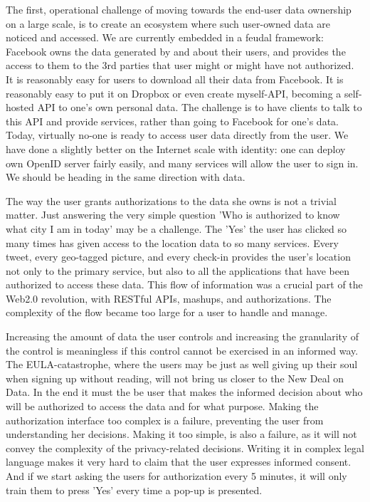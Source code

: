 The first, operational challenge of moving towards the end-user data ownership on a large scale, is to create an ecosystem where such user-owned data are noticed and accessed.
We are currently embedded in a feudal framework: Facebook owns the data generated by and about their users, and provides the access to them to the 3rd parties that user might or might have not authorized. 
It is reasonably easy for users to download all their data from Facebook. 
It is reasonably easy to put it on Dropbox or even create myself-API, becoming a self-hosted API to one's own personal data. 
The challenge is to have clients to talk to this API and provide services, rather than going to Facebook for one's data. 
Today, virtually no-one is ready to access user data directly from the user. 
We have done a slightly better on the Internet scale with identity: one can deploy own OpenID server fairly easily, and many services will allow the user to sign in. We should be heading in the same direction with data.

The way the user grants authorizations to the data she owns is not a trivial matter.
Just answering the very simple question 'Who is authorized to know what city I am in today' may be a challenge.
The 'Yes' the user has clicked so many times has given access to the location data to so many services.
Every tweet, every geo-tagged picture, and every check-in provides the user's location not only to the primary service, but also to all the applications that have been authorized to access these data.
This flow of information was a crucial part of the Web2.0 revolution, with RESTful APIs, mashups, and authorizations.
The complexity of the flow became too large for a user to handle and manage.

Increasing the amount of data the user controls and increasing the granularity of the control is meaningless if this control cannot be exercised in an informed way.
The EULA-catastrophe, where the users may be just as well giving up their soul when signing up without reading, will not bring us closer to the New Deal on Data.
In the end it must the be user that makes the informed decision about who will be authorized to access the data and for what purpose. 
Making the authorization interface too complex is a failure, preventing the user from understanding her decisions. 
Making it too simple, is also a failure, as it will not convey the complexity of the privacy-related decisions. 
Writing it in complex legal language makes it very hard to claim that the user expresses informed consent. 
And if we start asking the users for authorization every 5 minutes, it will only train them to press 'Yes' every time a pop-up is presented. 

